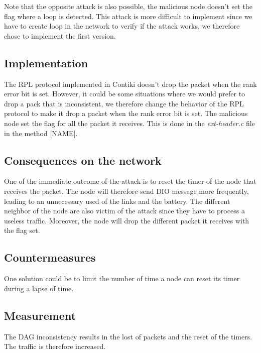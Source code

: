\documentclass{report}
\begin{document}
Note that the opposite attack is also possible, the malicious node doesn't set the flag where a loop is detected. This attack is more difficult to implement since we have to create loop in the network to verify if the attack works, we therefore chose to implement the first version.

\subsection*{Implementation}
The RPL protocol implemented in Contiki doesn't drop the packet when the rank error bit is set. However, it could be some situations where we would prefer to drop a pack that is inconsistent, we therefore change the behavior of the RPL protocol to make it drop a packet when the rank error bit is set. The malicious node set the flag for all the packet it receives. This is done in the \textit{ext-header.c} file in the method [NAME].

\subsection*{Consequences on the network}
One of the immediate outcome of the attack is to reset the timer of the node that receives the packet. The node will therefore send DIO message more frequently, leading to an unnecessary used of the links and the battery. The different neighbor of the node are also victim of the attack since they have to process a useless traffic. Moreover, the node will drop the different packet it receives with the flag set.

\subsection*{Countermeasures}

One solution could be to limit the number of time a node can reset its timer during a lapse of time. 
\subsection*{Measurement}
The DAG inconsistency results in the lost of packets and the reset of the timers. The traffic is therefore increased.

\end{document}
